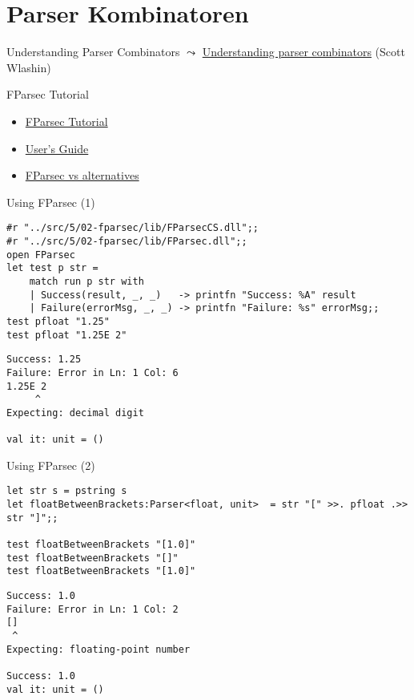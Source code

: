 \documentclass[t]{beamer}
\begin{document}
\section{Parser Kombinatoren }
\label{sec:org3348783}
\begin{frame}[label={sec:org7b54569}]{Understanding Parser Combinators}
\(\leadsto\) \href{./5 Understanding parser combinators.pdf}{Understanding parser combinators} (Scott Wlashin)
\end{frame}

\begin{frame}[label={sec:orgb2e078e}]{FParsec Tutorial}
\begin{itemize}
\item \href{http://www.quanttec.com/fparsec/tutorial.html\#}{FParsec Tutorial}
\item \href{http://www.quanttec.com/fparsec/users-guide/}{User’s Guide}
\item \href{http://www.quanttec.com/fparsec/about/fparsec-vs-alternatives.html}{FParsec vs alternatives}
\end{itemize}
\end{frame}

\begin{frame}[label={sec:org84ac197},fragile]{Using FParsec (1)}
 \begin{verbatim}
#r "../src/5/02-fparsec/lib/FParsecCS.dll";; 
#r "../src/5/02-fparsec/lib/FParsec.dll";;
open FParsec
let test p str =
    match run p str with
    | Success(result, _, _)   -> printfn "Success: %A" result
    | Failure(errorMsg, _, _) -> printfn "Failure: %s" errorMsg;;
test pfloat "1.25"
test pfloat "1.25E 2"
\end{verbatim}

\begin{verbatim}
Success: 1.25                           
Failure: Error in Ln: 1 Col: 6
1.25E 2
     ^
Expecting: decimal digit

val it: unit = ()
\end{verbatim}
\end{frame}

\begin{frame}[label={sec:org1359eae},fragile]{Using FParsec (2)}
 \begin{verbatim}
let str s = pstring s
let floatBetweenBrackets:Parser<float, unit>  = str "[" >>. pfloat .>> str "]";;

test floatBetweenBrackets "[1.0]"
test floatBetweenBrackets "[]"
test floatBetweenBrackets "[1.0]"
\end{verbatim}

\begin{verbatim}
Success: 1.0                            
Failure: Error in Ln: 1 Col: 2
[]
 ^
Expecting: floating-point number

Success: 1.0                            
val it: unit = ()
\end{verbatim}
\end{frame}
\end{document}
